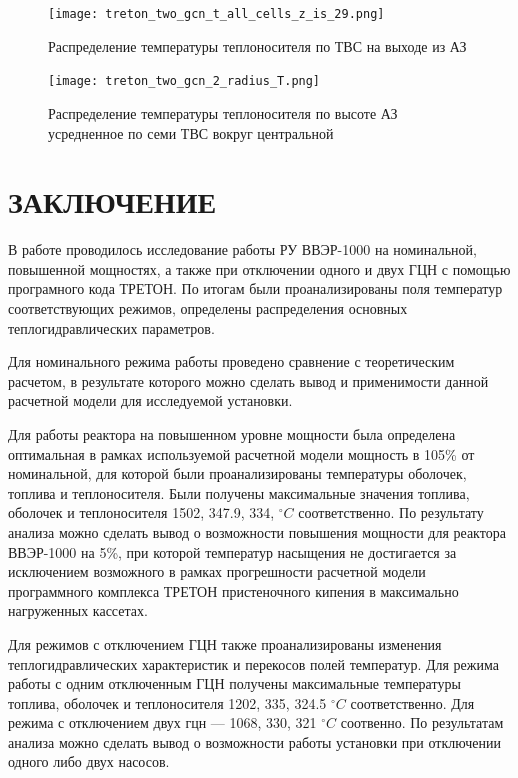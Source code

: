 \begin{figure}[H]
	\begin{center}
		\texttt{[image: treton\_two\_gcn\_t\_all\_cells\_z\_is\_29.png]}
		\caption{Распределение температуры теплоносителя по ТВС на выходе из АЗ}
		\label{pic:treton-two-gcn-t-all-cells-z-is-29}
	\end{center}
\end{figure}


\begin{figure}[H]
	\begin{center}
		\texttt{[image: treton\_two\_gcn\_2\_radius\_T.png]}
		\caption{Распределение температуры теплоносителя по высоте АЗ усредненное по семи ТВС вокруг центральной}
		\label{pic:treton-two-gcn-2-radius-T}
	\end{center}
\end{figure}

\section*{ЗАКЛЮЧЕНИЕ}
%
В работе проводилось исследование работы РУ ВВЭР-1000 на номинальной, повышенной мощностях, а также при отключении одного и двух ГЦН с помощью програмного кода ТРЕТОН. По итогам были проанализированы поля температур соответствующих режимов, определены распределения основных теплогидравлических параметров. 

Для номинального режима работы проведено сравнение с теоретическим расчетом, в результате которого можно сделать вывод и применимости данной расчетной модели для исследуемой установки.

Для работы реактора на повышенном уровне мощности была определена оптимальная в рамках используемой расчетной модели мощность в 105\% от номинальной, для которой были проанализированы температуры оболочек, топлива и теплоносителя. Были получены максимальные значения топлива, оболочек и теплоносителя 1502, 347.9, 334, $^\circ C$ соответственно. По результату анализа можно сделать вывод о возможности повышения мощности для реактора ВВЭР-1000 на 5\%, при которой температур насыщения не достигается за исключением возможного в рамках прогрешности расчетной модели программного комплекса ТРЕТОН пристеночного кипения в максимально нагруженных кассетах.

Для режимов с отключением ГЦН также проанализированы изменения теплогидравлических характеристик и перекосов полей температур. Для режима работы с одним отключенным ГЦН получены максимальные температуры топлива, оболочек и теплоносителя 1202, 335, 324.5 $^\circ C$ соответственно. Для режима с отключением двух гцн — 1068, 330, 321 $^\circ C$ соотвенно. По результатам анализа можно сделать вывод о возможности работы установки при отключении одного либо двух насосов.
